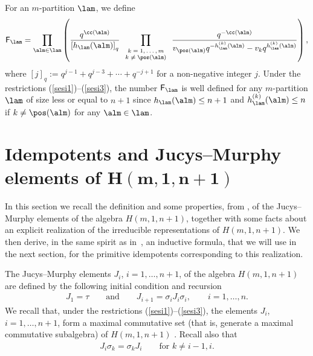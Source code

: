 For an $m$-partition $\lam$, we def\/ine
\begin{gather}\label{m-croc2}
\textsf{F}_{\lam}=\prod_{\alm\in \lam}\left(\frac{q^{\cc(\alm)}}{\left[h_{\lam}(\alm)\right]_q}\prod_{\textrm{\scriptsize{$\begin{array}{c}k=1,\dots,m\\k\neq\pos(\alm)\end{array}$}}}
\frac{q^{-\cc(\alm)}}{v_{\pos(\alm)}q^{-h^{(k)}_{\lam}(\alm)}-v_kq^{h^{(k)}_{\lam}(\alm)}}\right) ,
\end{gather}
where $[j]_q:=q^{j-1}+q^{j-3}+\cdots +q^{-j+1}$ for a non-negative integer $j$. Under the restrictions (\ref{sesi1})--(\ref{sesi3}),
the number $\textsf{F}_{\lam}$ is well def\/ined for any $m$-partition $\lam$ of size less or equal to $n+1$ since
$h_{\lam}(\alm)\leq n+1$ and $h^{(k)}_{\lam}(\alm)\leq n$ if $k\neq\pos(\alm)$ for any $\alm\in \lam$.


\section[Idempotents and Jucys--Murphy elements of $H(m,1,n+1)$]{Idempotents and Jucys--Murphy elements of $\boldsymbol{H(m,1,n+1)}$}\label{sec-idem}

In this section we recall the def\/inition and some properties, from  \cite{AK},
of the Jucys--Murphy elements of the algebra $H(m,1,n+1)$, together with some facts about an explicit realization of the irreducible representations of $H(m,1,n+1)$. We then derive, in the same spirit as in~\cite{Mo}, an inductive formula, that we will use in the next section, for the primitive idempotents corresponding to this realization.


The Jucys--Murphy elements $J_i$, $i=1,\dots,n+1$, of the algebra $H(m,1,n+1)$ are def\/ined by the following initial condition and recursion
\begin{gather*}%
J_1=\tau\qquad\textrm{and}\qquad J_{i+1}=\sigma_iJ_i\sigma_i,\qquad i=1,\dots,n.
\end{gather*}
We recall that, under the restrictions (\ref{sesi1})--(\ref{sesi3}), the elements $J_i$, $i=1,\dots,n+1$, form a maximal commutative set
(that is, generate a maximal commutative subalgebra) of $H(m,1,n+1)$ \cite[Proposition~3.17]{AK}.
Recall also that
\begin{gather*}%
J_i\sigma_k=\sigma_kJ_i\qquad\textrm{for \ \ $k\neq i-1,i$.}
\end{gather*}


